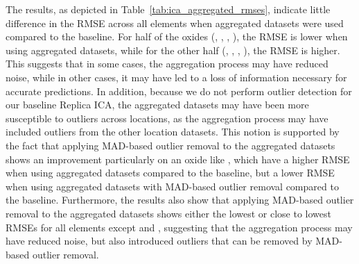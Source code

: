 The results, as depicted in Table~\ref{tab:ica_aggregated_rmses}, indicate little difference in the RMSE across all elements when aggregated datasets were used compared to the baseline.
For half of the oxides (, , , ), the RMSE is lower when using aggregated datasets, while for the other half (, , , ), the RMSE is higher.
This suggests that in some cases, the aggregation process may have reduced noise, while in other cases, it may have led to a loss of information necessary for accurate predictions.
In addition, because we do not perform outlier detection for our baseline Replica ICA, the aggregated datasets may have been more susceptible to outliers across locations, as the aggregation process may have included outliers from the other location datasets.
This notion is supported by the fact that applying MAD-based outlier removal to the aggregated datasets shows an improvement particularly on an oxide like , which have a higher RMSE when using aggregated datasets compared to the baseline, but a lower RMSE when using aggregated datasets with MAD-based outlier removal compared to the baseline.
Furthermore, the results also show that applying MAD-based outlier removal to the aggregated datasets shows either the lowest or close to lowest RMSEs for all elements except  and , suggesting that the aggregation process may have reduced noise, but also introduced outliers that can be removed by MAD-based outlier removal.
